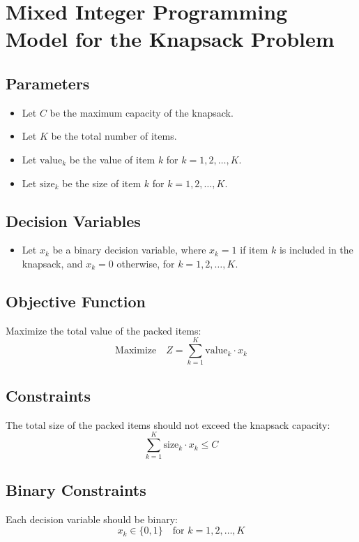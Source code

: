 \documentclass{article}
\begin{document}
\section*{Mixed Integer Programming Model for the Knapsack Problem}

\subsection*{Parameters}
\begin{itemize}
    \item Let \( C \) be the maximum capacity of the knapsack.
    \item Let \( K \) be the total number of items.
    \item Let \( \text{value}_k \) be the value of item \( k \) for \( k = 1, 2, \ldots, K \).
    \item Let \( \text{size}_k \) be the size of item \( k \) for \( k = 1, 2, \ldots, K \).
\end{itemize}

\subsection*{Decision Variables}
\begin{itemize}
    \item Let \( x_k \) be a binary decision variable, where \( x_k = 1 \) if item \( k \) is included in the knapsack, and \( x_k = 0 \) otherwise, for \( k = 1, 2, \ldots, K \).
\end{itemize}

\subsection*{Objective Function}
Maximize the total value of the packed items:
\[
\text{Maximize} \quad Z = \sum_{k=1}^{K} \text{value}_k \cdot x_k
\]

\subsection*{Constraints}
The total size of the packed items should not exceed the knapsack capacity:
\[
\sum_{k=1}^{K} \text{size}_k \cdot x_k \leq C
\]

\subsection*{Binary Constraints}
Each decision variable should be binary:
\[
x_k \in \{0, 1\} \quad \text{for } k = 1, 2, \ldots, K
\]
\end{document}
